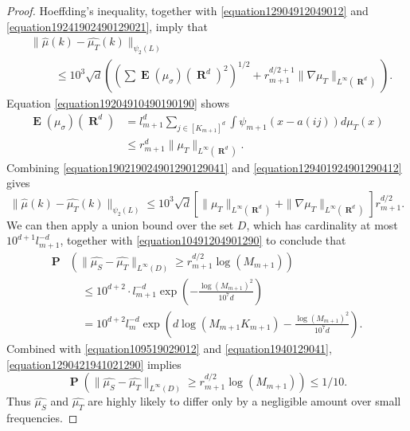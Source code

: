 \documentclass[12pt,reqno]{article}
\numberwithin{equation}{section}
\DeclareMathOperator{\RR}{\mathbf{R}}
\DeclareMathOperator{\EE}{\mathbf{E}}
\DeclareMathOperator{\PP}{\mathbf{P}}
\newcommand{\psitwo}[1]{\| {#1} \|_{\psi_2(L)}}
\begin{document}
\begin{proof}
    Hoeffding's inequality, together with \eqref{equation12904912049012} and \eqref{equation19241902490129021}, imply that
    \begin{equation} \label{equation190219024901290129041}
    \begin{split}
        & \psitwo{\widehat{\mu}(k) - \widehat{\mu_T}(k)}\\
        &\ \ \ \ \ \ \ \ \ \ \leq 10^3 \sqrt{d} \left( \left( \sum \EE(\mu_\sigma)(\RR^d)^2 \right)^{1/2} + r_{m+1}^{d/2+1} \| \nabla \mu_T \|_{L^\infty(\RR^d)} \right).
    \end{split}
    \end{equation}
    Equation \eqref{equation19204910490190190} shows
    \begin{equation} \label{equation129401924901290412}
    \begin{split}
        \EE(\mu_\sigma)(\RR^d) &= l_{m+1}^d \sum_{j \in [K_{m+1}]^d} \int \psi_{m+1}(x - a(ij)) d\mu_T(x)\\
        &\leq r_{m+1}^d \| \mu_T \|_{L^\infty(\RR^d)}.
    \end{split}
    \end{equation}
    Combining \eqref{equation190219024901290129041} and \eqref{equation129401924901290412} gives
    \begin{equation} \label{equation10491204901290}
        \psitwo{\widehat{\mu}(k) - \widehat{\mu_T}(k)} \leq 10^3 \sqrt{d} \left[ \| \mu_T \|_{L^\infty(\RR^d)} + \| \nabla \mu_T \|_{L^\infty(\RR^d)} \right] r_{m+1}^{d/2}.
    \end{equation}
    We can then apply a union bound over the set $D$, which has cardinality at most $10^{d+1} l_{m+1}^{-d}$, together with \eqref{equation10491204901290} to conclude that
    \begin{equation} \label{equation1290421941021290}
    \begin{split}
        \PP& \left(\| \widehat{\mu_S} - \widehat{\mu_T} \|_{L^\infty(D)} \geq r_{m+1}^{d/2} \log(M_{m+1}) \right)\\
        &\ \ \ \ \ \leq 10^{d+2} \cdot l_{m+1}^{-d} \exp \left( - \frac{\log(M_{m+1})^2}{10^7 d} \right)\\
        &\ \ \ \ \ = 10^{d+2} l_m^{-d} \exp \left( d \log(M_{m+1} K_{m+1}) - \frac{\log(M_{m+1})^2}{10^7 d} \right).
    \end{split}
    \end{equation}
    Combined with \eqref{equation109519029012} and \eqref{equation1940129041}, \eqref{equation1290421941021290} implies
    \begin{equation} \label{equation0148912489128}
        \PP \left(\| \widehat{\mu_S} - \widehat{\mu_T} \|_{L^\infty(D)} \geq r_{m+1}^{d/2} \log(M_{m+1}) \right) \leq 1/10.
    \end{equation}
    Thus $\widehat{\mu_S}$ and $\widehat{\mu_T}$ are highly likely to differ only by a negligible amount over small frequencies.
\end{proof}
\end{document}
